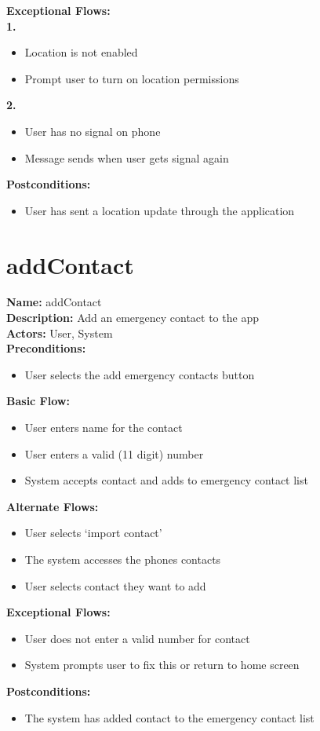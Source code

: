 \documentclass[a4paper]{report}
\begin{document}
\textbf{Exceptional Flows:} \\
\textbf{1.}
\begin{itemize}
	\item Location is not enabled
	\item Prompt user to turn on location permissions
\end{itemize}
\textbf{2.} 
\begin{itemize}
	\item User has no signal on phone 
	\item Message sends when user gets signal again
\end{itemize}
\textbf{Postconditions:}
\begin{itemize}
	\item User has sent a location update through the application
\end{itemize}

\section{addContact}
\textbf{Name:} addContact\\
\textbf{Description:} Add an emergency contact to the app\\
\textbf{Actors:} User, System\\
\textbf{Preconditions:} 
\begin{itemize}
	\item User selects the add emergency contacts button
\end{itemize}
\textbf{Basic Flow:}
\begin{itemize}
	\item User enters name for the contact
	\item User enters a valid (11 digit) number
	\item System accepts contact and adds to emergency contact list
\end{itemize}
\textbf{Alternate Flows:} 
\begin{itemize}
	\item User selects ‘import contact’
	\item The system accesses the phones contacts
	\item User selects contact they want to add
\end{itemize}
\textbf{Exceptional Flows:} \begin{itemize}
	\item User does not enter a valid number for contact
	\item System prompts user to fix this or return to home screen
\end{itemize}
\textbf{Postconditions:}
\begin{itemize}
	\item The system has added contact to the emergency contact list
\end{itemize}
\end{document}
